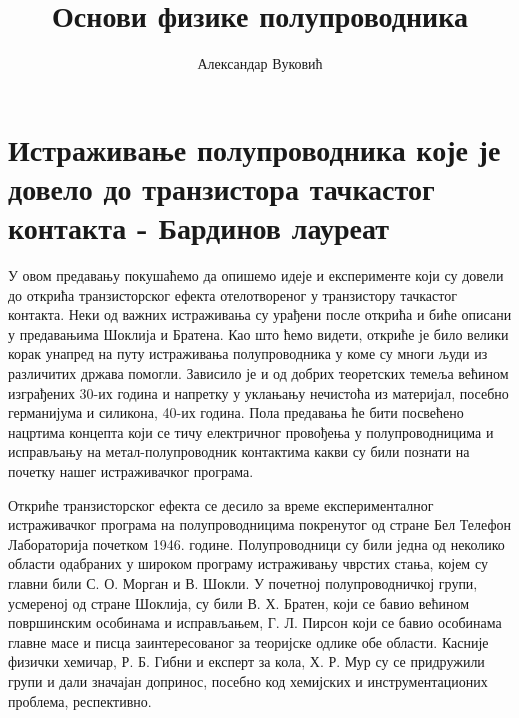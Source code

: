 \documentclass{article}
\title{Основи физике полупроводника} %
\author{Александар Вуковић} %
\begin{document}
\maketitle %



\section{Истраживање полупроводника које је довело до транзистора тачкастог контакта - Бардинов лауреат }

У овом предавању покушаћемо да опишемо идеје и експерименте који су довели до открића транзисторског ефекта отелотвореног у транзистору тачкастог контакта. Неки од важних истраживања су урађени после открића и биће описани у предавањима Шоклија и Братена. Као што ћемо видети, откриће је било велики корак унапред на путу истраживања полупроводника у коме су многи људи из различитих држава помогли. Зависило је и од добрих теоретских темеља већином изграђених 30-их година и напретку у уклањању нечистоћа из материјал, посебно германијума и силикона, 40-их година. Пола предавања ће бити посвећено нацртима концепта који се тичу електричног провођења у полупроводницима и исправљању на метал-полупроводник контактима какви су били познати на почетку нашег истраживачког програма.

Откриће транзисторског ефекта се десило за време експерименталног истраживачког програма на полупроводницима покренутог од стране Бел Телефон Лабораторија почетком 1946. године. Полупроводници су били једна од неколико области одабраних у широком програму истраживању чврстих стања, којем су главни били С. О. Морган и В. Шокли. У почетној полупроводничкој групи, усмереној од стране Шоклија, су били В. Х. Братен, који се бавио већином површинским особинама и исправљањем, Г. Л. Пирсон који се бавио особинама главне масе и писца заинтересованог за теоријске одлике обе области. Касније физички хемичар, Р. Б. Гибни и експерт за кола, Х. Р. Мур су се придружили групи и дали значајан допринос, посебно код хемијских и инструментационих проблема, респективно.
\end{document}
